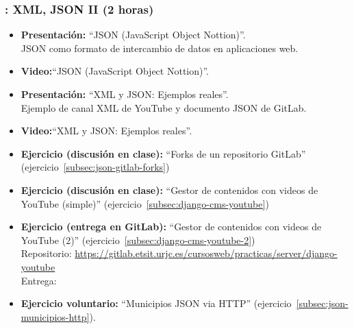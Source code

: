 \documentclass[a4paper,12pt]{article}
\begin{document}
\subsubsection{\lunesK: XML, JSON II (2 horas)}
\label{cal:lunesK}

\begin{itemize}
\item \textbf{Presentación:} ``JSON (JavaScript Object Nottion)''. \\
  JSON como formato de intercambio de datos en aplicaciones web.
\item \textbf{Video:}``JSON (JavaScript Object Nottion)''.
\item \textbf{Presentación:} ``XML y JSON: Ejemplos reales''. \\
  Ejemplo de canal XML de YouTube y documento JSON de GitLab.
\item \textbf{Video:}``XML y JSON: Ejemplos reales''.
\item \textbf{Ejercicio (discusión en clase):} ``Forks de un repositorio GitLab''
  (ejercicio~\ref{subsec:json-gitlab-forks})
\item \textbf{Ejercicio (discusión en clase):} ``Gestor de contenidos con videos de YouTube (simple)'' (ejercicio~\ref{subsec:django-cms-youtube})
\item \textbf{Ejercicio (entrega en GitLab):} ``Gestor de contenidos con videos de YouTube (2)'' (ejercicio~\ref{subsec:django-cms-youtube-2}) \\
  Repositorio: \url{https://gitlab.etsit.urjc.es/cursosweb/practicas/server/django-youtube} \\
  Entrega: \juevesM
\item \textbf{Ejercicio voluntario:} ``Municipios JSON via HTTP'' (ejercicio~\ref{subsec:json-municipios-http}).
\end{itemize}

\end{document}
